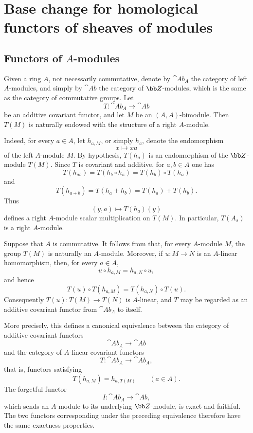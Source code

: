\section{Base change for homological functors of sheaves of modules}
\label{section:III.7}


\subsection{Functors of $A$-modules}
\label{subsection:III.7.1}

\begin{env}[7.1.1]
\label{III.7.1.1}
Given a ring $A$, not necessarily commutative, denote by
$\cat{Ab}_A$ the category of left $A$-modules, and simply by
$\cat{Ab}$ the category of $\bb Z$-modules, which is the same
as the category of commutative groups.  Let
\[
  T:\cat{Ab}_A\longrightarrow\cat{Ab}
\]
be an additive covariant functor, and let $M$ be an
$(A,A)$-bimodule.  Then $T(M)$ is naturally endowed with the
structure of a right $A$-module.

Indeed, for every $a\in A$, let $h_{a,M}$, or simply $h_a$,
denote the endomorphism
\[
  x\longmapsto xa
\]
of the left $A$-module $M$.  By hypothesis, $T(h_a)$ is an
endomorphism of the $\bb Z$-module $T(M)$.  Since $T$ is
covariant and additive, for $a,b\in A$ one has
\[
  T(h_{ab})
  =
  T(h_b\circ h_a)
  =
  T(h_b)\circ T(h_a)
\]
and
\[
  T(h_{a+b})
  =
  T(h_a+h_b)
  =
  T(h_a)+T(h_b).
\]
Thus
\[
  (y,a)\longmapsto T(h_a)(y)
\]
defines a right $A$-module scalar multiplication on $T(M)$.
In particular, $T(A_s)$ is a right $A$-module.
\end{env}

\begin{env}[7.1.2]
\label{III.7.1.2}
Suppose that $A$ is commutative.  It follows from
 that, for every $A$-module $M$, the group
$T(M)$ is naturally an $A$-module.  Moreover, if
$u:M\to N$ is an $A$-linear homomorphism, then, for every
$a\in A$,
\[
  u\circ h_{a,M}=h_{a,N}\circ u,
\]
and hence
\[
  T(u)\circ T(h_{a,M})
  =
  T(h_{a,N})\circ T(u).
\]
Consequently $T(u):T(M)\to T(N)$ is $A$-linear, and $T$ may be
regarded as an additive covariant functor from $\cat{Ab}_A$ to
itself.

More precisely, this defines a canonical equivalence between
the category of additive covariant functors
\[
  \cat{Ab}_A\longrightarrow\cat{Ab}
\]
and the category of $A$-linear covariant functors
\[
  T:\cat{Ab}_A\longrightarrow\cat{Ab}_A,
\]
that is, functors satisfying
\[
  T(h_{a,M})=h_{a,T(M)}
  \qquad(a\in A).
\]
The forgetful functor
\[
  I:\cat{Ab}_A\longrightarrow\cat{Ab},
\]
which sends an $A$-module to its underlying $\bb Z$-module, is
exact and faithful.  The two functors corresponding under the
preceding equivalence therefore have the same exactness
properties.
\end{env}

